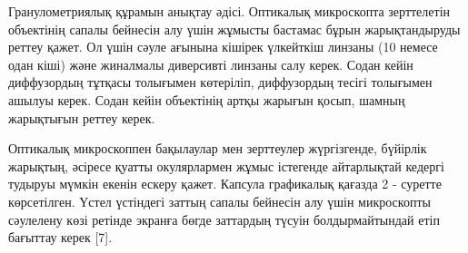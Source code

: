 \begin{multicols}{2}
Гранулометриялық құрамын анықтау әдісі. Оптикалық микроскопта
зерттелетін объектінің сапалы бейнесін алу үшін жұмысты бастамас бұрын
жарықтандыруды реттеу қажет. Ол үшін сәуле ағынына кішірек үлкейткіш
линзаны (10 немесе одан кіші) және жиналмалы диверсивті линзаны салу
керек. Содан кейін диффузордың тұтқасы толығымен көтеріліп, диффузордың
тесігі толығымен ашылуы керек. Содан кейін объектінің артқы жарығын
қосып, шамның жарықтығын реттеу керек.

Оптикалық микроскоппен бақылаулар мен зерттеулер жүргізгенде, бүйірлік
жарықтың, әсіресе қуатты окулярлармен жұмыс істегенде айтарлықтай
кедергі тудыруы мүмкін екенін ескеру қажет. Капсула графикалық қағазда 2
- суретте көрсетілген. Үстел үстіндегі заттың сапалы бейнесін алу үшін
микроскопты сәулелену көзі ретінде экранға бөгде заттардың түсуін
болдырмайтындай етіп бағыттау керек {[}7{]}.
\end{multicols}

